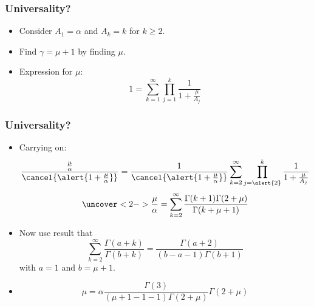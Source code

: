 \begin{frame}
  \frametitle{Universality?}

  \begin{itemize}
  \item<1->
    Consider $A_1 = \alpha$ and $A_k = k$ for $k \ge 2$.
  \item<2-> 
    Find $\gamma = \mu + 1$ by finding $\mu$.
  \item<3->
    Expression for $\mu$: 
    $$
    1 =
    \sum_{k=1}^{\infty} 
    \prod_{j=1}^{k}
    \frac{1}{1 + \frac{\mu}{A_j}}
    $$
  \end{itemize}

\end{frame}

\begin{frame}
  \frametitle{Universality?}
  
  \begin{itemize}
  \item<1-> Carrying on:
    $$
    \frac{\frac{\mu}{\alpha}}{\cancel{\alert{1 + \frac{\mu}{\alpha}}}}
    =
    \frac{1}{\cancel{\alert{1 + \frac{\mu}{\alpha}}}}
    \sum_{k=2}^{\infty} 
    \prod_{j=\alert{2}}^{k}
    \frac{1}{1 + \frac{\mu}{A_j}}
    $$
    $$
    \uncover<2->{
      \frac{\mu}{\alpha}
      =
      \sum_{k=2}^{\infty} 
      \frac{\Gamma(k+1)\Gamma(2+\mu)}{\Gamma(k+\mu+1)}
    }
    $$
  \item<3->
    Now use result that\cite{krapivsky2001a}
    $$
    \sum_{k=2}^{\infty}
    \frac{\Gamma(a+k)}{\Gamma(b+k)}
    =
    \frac{\Gamma(a+2)}{(b-a-1)\Gamma(b+1)}
    $$
    with $a=1$ and $b=\mu+1$.
  \item<4->
    $$
    \mu = \alpha \frac{\Gamma(3)}{(\mu+1-1-1)\Gamma(2+\mu)} \Gamma(2+\mu)
    $$
  \end{itemize}

\end{frame}

